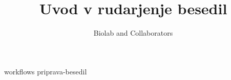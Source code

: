 \documentclass[symmetric, justified, a4paper]{tufte-book}
\title{Uvod v rudarjenje besedil}
\author[Biolab and Collaborators]{Biolab and Collaborators}
\begin{document}
\frontmatter

\maketitle



\tableofcontents

% 

\mainmatter



{workflows}
{priprava-besedil}


\backmatter





\printindex
\end{document}
